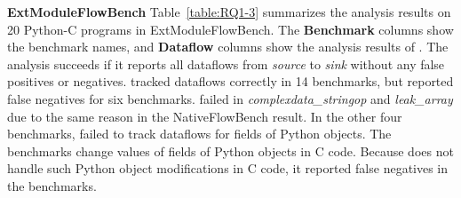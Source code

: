 


\textbf{ExtModuleFlowBench}
Table~\ref{table:RQ1-3} summarizes the analysis results on 20 Python-C programs
in ExtModuleFlowBench.
The {\bf Benchmark} columns show the benchmark names, and {\bf Dataflow}
columns show the analysis results of \ours.
The analysis succeeds if it reports all dataflows from {\it source} to {\it
sink} without any false positives or negatives.
\ours tracked dataflows correctly in 14 benchmarks, but reported false
negatives for six benchmarks.
\ours failed in {\it complexdata\_stringop} and {\it leak\_array} due to the
same reason in the NativeFlowBench result. 
In the other four benchmarks, \ours failed to track dataflows for fields of
Python objects. 
The benchmarks change values of fields of Python objects in C code. 
Because \ours does not handle such Python object modifications in C code, it
reported false negatives in the benchmarks.



